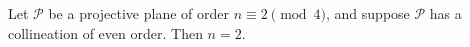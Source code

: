 Let $\mathcal{P}$ be a projective plane of order $n \equiv 2 \pmod{4}$, and suppose $\mathcal{P}$ has a collineation of even order. Then $n = 2$.
